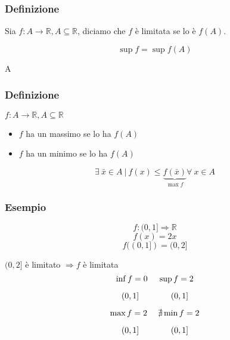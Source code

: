     \subsubsection*{Definizione}
        Sia $f:A\rightarrow \mathbb{R}, A \subseteq \mathbb{R}$, diciamo che $f$ è limitata se lo è $f(A)$.
        \begin{Large}
            \[
                \sup{f} = \sup{f(A)}    
            \]
        \end{Large}
        \vspace{-7.5ex}
        \begin{center}
            \begin{small}
                \hspace{0.7cm}A
            \end{small}
        \end{center}

    \subsubsection*{Definizione}
        $f:A \rightarrow \mathbb{R}, A \subseteq \mathbb{R}$
        \begin{itemize}
            \item $f$ ha un massimo se lo ha $f(A)$
            \item $f$ ha un minimo se lo ha $f(A)$
        \end{itemize}
        \begin{Large}
            \[
                \exists\ \bar{x} \in A\ |\ f(x) \leq \underbrace{f(\bar{x})}_{\max{f}} \forall\ x \in A
            \]
        \end{Large}
    \subsubsection*{Esempio}
        \[
            f:(0,1]\Rightarrow\mathbb{R}    
        \]
        \[
            f(x) = 2x    
        \]
        \[
            f((0,1]) = (0,2]    
        \]

        $ (0,2]$ è limitato $\Rightarrow f$ è limitata
        \[
            \inf{f} = 0  \text{\hspace{3ex}} \sup{f} = 2
        \]
        \vspace{-4.5ex}
        \begin{small}
            \[(0,1] \text{\hspace{9ex}} (0,1]\]
        \end{small}
        \[
            \max{f} = 2  \text{\hspace{3ex}} \nexists \min{f} = 2
        \]
        \vspace{-4ex}
        \begin{small}
            \[(0,1] \text{\hspace{9ex}} (0,1]\]
        \end{small}

